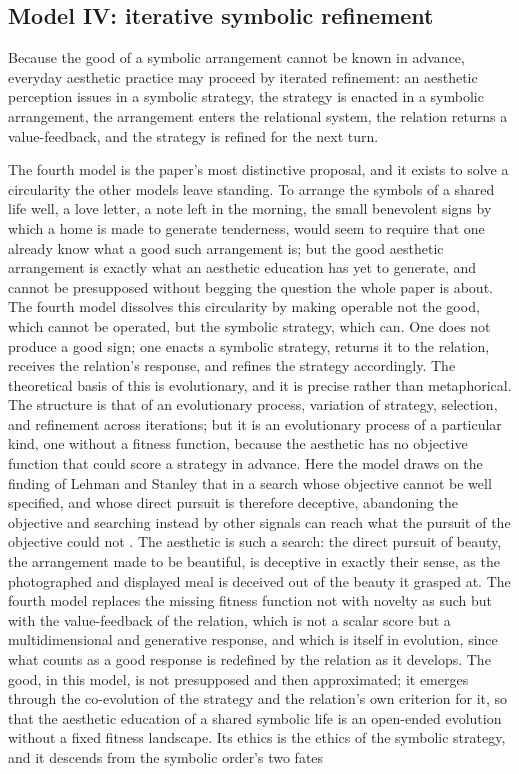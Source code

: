 \subsection{Model IV: iterative symbolic refinement}
\label{p23:sub:typ-model4}

\begin{claim}[Model IV]
Because the good of a symbolic arrangement cannot be known in advance, everyday aesthetic practice may proceed by iterated refinement: an aesthetic perception issues in a symbolic strategy, the strategy is enacted in a symbolic arrangement, the arrangement enters the relational system, the relation returns a value-feedback, and the strategy is refined for the next turn.
\end{claim}

The fourth model is the paper's most distinctive proposal, and it exists to solve a circularity the other models leave standing. To arrange the symbols of a shared life well, a love letter, a note left in the morning, the small benevolent signs by which a home is made to generate tenderness, would seem to require that one already know what a good such arrangement is; but the good aesthetic arrangement is exactly what an aesthetic education has yet to generate, and cannot be presupposed without begging the question the whole paper is about. The fourth model dissolves this circularity by making operable not the good, which cannot be operated, but the symbolic strategy, which can. One does not produce a good sign; one enacts a symbolic strategy, returns it to the relation, receives the relation's response, and refines the strategy accordingly. The theoretical basis of this is evolutionary, and it is precise rather than metaphorical. The structure is that of an evolutionary process, variation of strategy, selection, and refinement across iterations; but it is an evolutionary process of a particular kind, one without a fitness function, because the aesthetic has no objective function that could score a strategy in advance. Here the model draws on the finding of Lehman and Stanley that in a search whose objective cannot be well specified, and whose direct pursuit is therefore deceptive, abandoning the objective and searching instead by other signals can reach what the pursuit of the objective could not \parencite{lehman2011}. The aesthetic is such a search: the direct pursuit of beauty, the arrangement made to be beautiful, is deceptive in exactly their sense, as the photographed and displayed meal is deceived out of the beauty it grasped at. The fourth model replaces the missing fitness function not with novelty as such but with the value-feedback of the relation, which is not a scalar score but a multidimensional and generative response, and which is itself in evolution, since what counts as a good response is redefined by the relation as it develops. The good, in this model, is not presupposed and then approximated; it emerges through the co-evolution of the strategy and the relation's own criterion for it, so that the aesthetic education of a shared symbolic life is an open-ended evolution without a fixed fitness landscape. Its ethics is the ethics of the symbolic strategy, and it descends from the symbolic order's two fates 